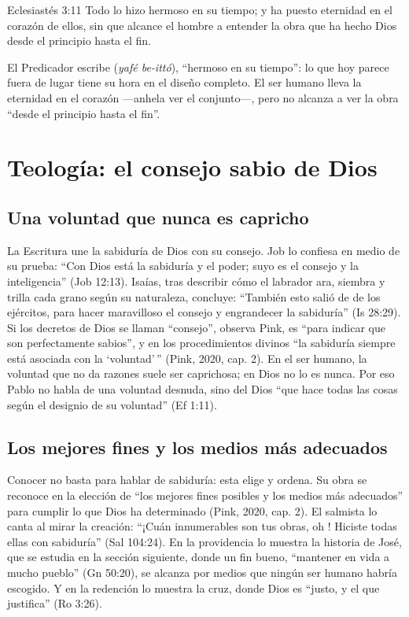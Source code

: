 \begin{verso}{Eclesiastés 3:11}
Todo lo hizo hermoso en su tiempo; y ha puesto eternidad en el corazón de ellos, sin que alcance el hombre a entender la obra que ha hecho Dios desde el principio hasta el fin.
\end{verso}

El Predicador escribe  (\emph{yafé be-ittó}), ``hermoso en su tiempo'': lo que hoy parece fuera de lugar tiene su hora en el diseño completo. El ser humano lleva la eternidad en el corazón ---anhela ver el conjunto---, pero no alcanza a ver la obra ``desde el principio hasta el fin''.

\section{Teología: el consejo sabio de Dios}

\subsection{Una voluntad que nunca es capricho}
La Escritura une la sabiduría de Dios con su consejo. Job lo confiesa en medio de su prueba: ``Con Dios está la sabiduría y el poder; suyo es el consejo y la inteligencia'' (Job 12:13). Isaías, tras describir cómo el labrador ara, siembra y trilla cada grano según su naturaleza, concluye: ``También esto salió de \SENOR{} de los ejércitos, para hacer maravilloso el consejo y engrandecer la sabiduría'' (Is 28:29). Si los decretos de Dios se llaman ``consejo'', observa Pink, es ``para indicar que son perfectamente sabios'', y en los procedimientos divinos ``la sabiduría siempre está asociada con la `voluntad'\,'' (Pink, 2020, cap. 2). En el ser humano, la voluntad que no da razones suele ser caprichosa; en Dios no lo es nunca. Por eso Pablo no habla de una voluntad desnuda, sino del Dios ``que hace todas las cosas según el designio de su voluntad'' (Ef 1:11).

\subsection{Los mejores fines y los medios más adecuados}
Conocer no basta para hablar de sabiduría: esta elige y ordena. Su obra se reconoce en la elección de ``los mejores fines posibles y los medios más adecuados'' para cumplir lo que Dios ha determinado (Pink, 2020, cap. 2). El salmista lo canta al mirar la creación: ``¡Cuán innumerables son tus obras, oh \SENOR{}! Hiciste todas ellas con sabiduría'' (Sal 104:24). En la providencia lo muestra la historia de José, que se estudia en la sección siguiente, donde un fin bueno, ``mantener en vida a mucho pueblo'' (Gn 50:20), se alcanza por medios que ningún ser humano habría escogido. Y en la redención lo muestra la cruz, donde Dios es ``justo, y el que justifica'' (Ro 3:26).

